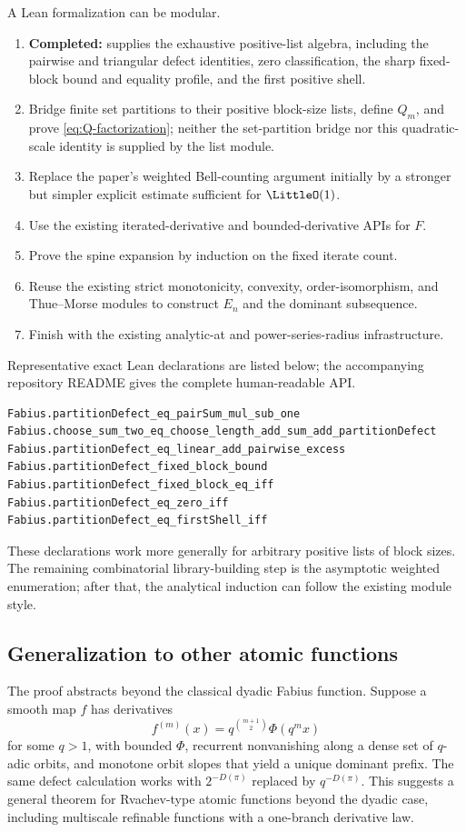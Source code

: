 \documentclass[11pt,oneside]{article}
\theoremstyle{definition}
\theoremstyle{remark}
\begin{document}
A Lean formalization can be modular.
\begin{enumerate}[label=\arabic*.]
 \item \textbf{Completed:}  supplies the exhaustive
 positive-list algebra, including the pairwise and triangular defect identities,
 zero classification, the sharp fixed-block bound and equality profile, and the
 first positive shell.
 \item Bridge finite set partitions to their positive block-size lists, define
 $Q_m$, and prove \eqref{eq:Q-factorization}; neither the set-partition bridge nor
 this quadratic-scale identity is supplied by the list module.
 \item Replace the paper's weighted Bell-counting argument initially by a stronger but simpler
 explicit estimate sufficient for $\LittleO(1)$.
 \item Use the existing iterated-derivative and bounded-derivative APIs for $F$.
 \item Prove the spine expansion by induction on the fixed iterate count.
 \item Reuse the existing strict monotonicity, convexity, order-isomorphism, and
 Thue--Morse modules to construct $E_n$ and the dominant subsequence.
 \item Finish with the existing analytic-at and power-series-radius infrastructure.
\end{enumerate}
Representative exact Lean declarations are listed below; the accompanying
repository README gives the complete human-readable API.
\begin{lstlisting}
Fabius.partitionDefect_eq_pairSum_mul_sub_one
Fabius.choose_sum_two_eq_choose_length_add_sum_add_partitionDefect
Fabius.partitionDefect_eq_linear_add_pairwise_excess
Fabius.partitionDefect_fixed_block_bound
Fabius.partitionDefect_fixed_block_eq_iff
Fabius.partitionDefect_eq_zero_iff
Fabius.partitionDefect_eq_firstShell_iff
\end{lstlisting}
These declarations work more generally for arbitrary positive lists of block
sizes.  The remaining combinatorial library-building step is the asymptotic
weighted enumeration; after that, the analytical induction can follow the
existing module style.

\subsection{Generalization to other atomic functions}

The proof abstracts beyond the classical dyadic Fabius function.  Suppose a smooth
map $f$ has derivatives
\begin{equation}
 f^{(m)}(x)=q^{\binom{m+1}{2}}\Phi(q^m x)
 \label{eq:q-atomic-derivatives}
\end{equation}
for some $q>1$, with bounded $\Phi$, recurrent nonvanishing along a dense set of
$q$-adic orbits, and monotone orbit slopes that yield a unique dominant prefix.
The same defect calculation works with $2^{-D(\pi)}$ replaced by $q^{-D(\pi)}$.
This suggests a general theorem for Rvachev-type atomic functions beyond the dyadic
case, including multiscale refinable functions with a one-branch derivative law.
\end{document}
